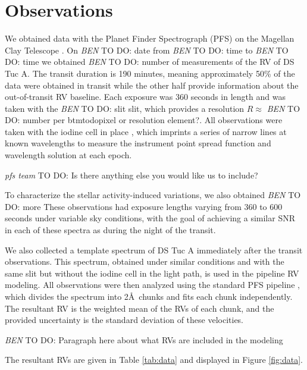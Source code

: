 \documentclass[twocolumn]{aastex63}
\newcommand{\todo}[3]{{\color{#2} \emph{#1} TO DO: #3}}
\newcommand{\btmtodo}[1]{\todo{BEN}{blue}{#1}}
\begin{document}
\section{Observations}
\label{sec:obs}

We obtained data with the Planet Finder Spectrograph (PFS) on the Magellan Clay Telescope \citep{Crane06, Crane08, Crane10}. 
On \btmtodo{date} from \btmtodo{time} to \btmtodo{time} we obtained \btmtodo{number} of measurements of the RV of DS Tuc A. The transit duration is 190 minutes, meaning approximately 50\% of the data were obtained in transit while the other half provide information about the out-of-transit RV baseline. Each exposure was 360 seconds in length and was taken with the \btmtodo{slit} slit, which provides a resolution $R \approx$ \btmtodo{number} per btmtodo{pixel or resolution element?}. All observations were taken with the iodine cell in place \citep{Marcy92}, which imprints a series of narrow lines at known wavelengths to measure the instrument point spread function and wavelength solution at each epoch.

\todo{pfs team}{red}{Is there anything else you would like us to include?}

To characterize the stellar activity-induced variations, we also obtained \btmtodo{more}
These observations had exposure lengths varying from 360 to 600 seconds under variable sky conditions, with the goal of achieving a similar SNR in each of these spectra as during the night of the transit.

We also collected a template spectrum of DS Tuc A immediately after the transit observations. 
This spectrum, obtained under similar conditions and with the same slit but without the iodine cell in the light path, is used in the pipeline RV modeling.
All observations were then analyzed using the standard PFS pipeline \citep{Butler96}, which divides the spectrum into 2\AA\ chunks and fits each chunk independently.
The resultant RV is the weighted mean of the RVs of each chunk, and the provided uncertainty is the standard deviation of these velocities.

\btmtodo{Paragraph here about what RVs are included in the modeling}

The resultant RVs are given in Table \ref{tab:data} and displayed in Figure \ref{fig:data}.



\end{document}
